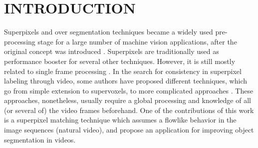 \section{INTRODUCTION}
\label{sec:introduction}
Superpixels and over segmentation techniques
became a widely used pre-processing stage for a
large number of machine vision applications, after the
original concept was introduced \cite{c1}. Superpixels are
traditionally used as performance booster for several
other techniques. However, it is still mostly related to
single frame processing \cite{c1}\cite{c10}\cite{c11}. In the search for
consistency in superpixel labeling through video,
some authors have proposed different techniques,
which go from simple extension to supervoxels\cite{c9}\cite{c11},
to more complicated approaches \cite{c8}. These
approaches, nonetheless, usually require a global
processing and knowledge of all (or several of) the
video frames beforehand. One of the contributions of this work is a superpixel
matching technique which assumes a flowlike
behavior in the image sequences (natural video), and
propose an application for improving object segmentation in videos.

